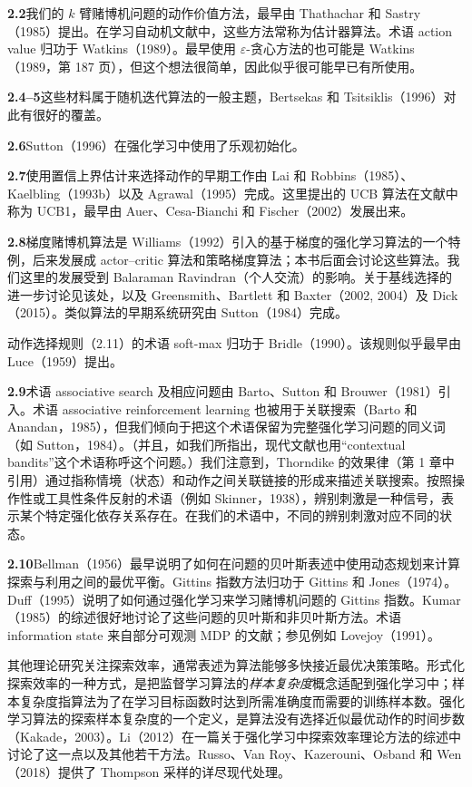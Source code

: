 \documentclass[UTF8,12pt,a4paper,fontset=fandol]{ctexart}
\begin{document}
\noindent\textbf{2.2}\quad 我们的 $k$ 臂赌博机问题的动作价值方法，最早由 Thathachar 和 Sastry（1985）提出。在学习自动机文献中，这些方法常称为估计器算法。术语 action value 归功于 Watkins（1989）。最早使用 $\varepsilon$-贪心方法的也可能是 Watkins（1989，第 187 页），但这个想法很简单，因此似乎很可能早已有所使用。

\noindent\textbf{2.4--5}\quad 这些材料属于随机迭代算法的一般主题，Bertsekas 和 Tsitsiklis（1996）对此有很好的覆盖。

\noindent\textbf{2.6}\quad Sutton（1996）在强化学习中使用了乐观初始化。

\noindent\textbf{2.7}\quad 使用置信上界估计来选择动作的早期工作由 Lai 和 Robbins（1985）、Kaelbling（1993b）以及 Agrawal（1995）完成。这里提出的 UCB 算法在文献中称为 UCB1，最早由 Auer、Cesa-Bianchi 和 Fischer（2002）发展出来。

\noindent\textbf{2.8}\quad 梯度赌博机算法是 Williams（1992）引入的基于梯度的强化学习算法的一个特例，后来发展成 actor--critic 算法和策略梯度算法；本书后面会讨论这些算法。我们这里的发展受到 Balaraman Ravindran（个人交流）的影响。关于基线选择的进一步讨论见该处，以及 Greensmith、Bartlett 和 Baxter（2002, 2004）及 Dick（2015）。类似算法的早期系统研究由 Sutton（1984）完成。

动作选择规则（2.11）的术语 soft-max 归功于 Bridle（1990）。该规则似乎最早由 Luce（1959）提出。

\noindent\textbf{2.9}\quad 术语 associative search 及相应问题由 Barto、Sutton 和 Brouwer（1981）引入。术语 associative reinforcement learning 也被用于关联搜索（Barto 和 Anandan，1985），但我们倾向于把这个术语保留为完整强化学习问题的同义词（如 Sutton，1984）。（并且，如我们所指出，现代文献也用“contextual bandits”这个术语称呼这个问题。）我们注意到，Thorndike 的效果律（第 1 章中引用）通过指称情境（状态）和动作之间关联链接的形成来描述关联搜索。按照操作性或工具性条件反射的术语（例如 Skinner，1938），辨别刺激是一种信号，表示某个特定强化依存关系存在。在我们的术语中，不同的辨别刺激对应不同的状态。

\noindent\textbf{2.10}\quad Bellman（1956）最早说明了如何在问题的贝叶斯表述中使用动态规划来计算探索与利用之间的最优平衡。Gittins 指数方法归功于 Gittins 和 Jones（1974）。Duff（1995）说明了如何通过强化学习来学习赌博机问题的 Gittins 指数。Kumar（1985）的综述很好地讨论了这些问题的贝叶斯和非贝叶斯方法。术语 information state 来自部分可观测 MDP 的文献；参见例如 Lovejoy（1991）。

其他理论研究关注探索效率，通常表述为算法能够多快接近最优决策策略。形式化探索效率的一种方式，是把监督学习算法的\textit{样本复杂度}概念适配到强化学习中；样本复杂度指算法为了在学习目标函数时达到所需准确度而需要的训练样本数。强化学习算法的探索样本复杂度的一个定义，是算法没有选择近似最优动作的时间步数（Kakade，2003）。Li（2012）在一篇关于强化学习中探索效率理论方法的综述中讨论了这一点以及其他若干方法。Russo、Van Roy、Kazerouni、Osband 和 Wen（2018）提供了 Thompson 采样的详尽现代处理。
\end{document}
